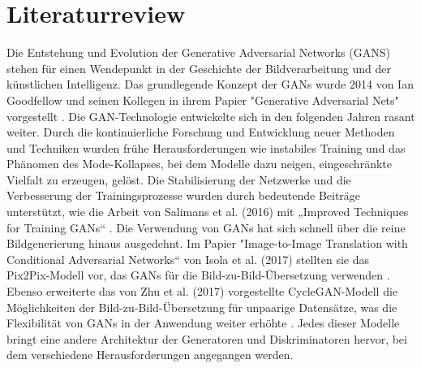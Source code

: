 \chapter{Literaturreview}

Die Entstehung und Evolution der Generative Adversarial Networks (GANS) stehen für einen Wendepunkt in der Geschichte der Bildverarbeitung und der künstlichen Intelligenz. Das grundlegende Konzept der GANs wurde 2014 von Ian Goodfellow und seinen Kollegen in ihrem Papier "Generative Adversarial Nets" vorgestellt \cite{Goodfellow2014}.\newline
Die GAN-Technologie entwickelte sich in den folgenden Jahren rasant weiter. Durch die kontinuierliche Forschung und Entwicklung neuer Methoden und Techniken wurden frühe Herausforderungen wie instabiles Training und das Phänomen des Mode-Kollapses, bei dem Modelle dazu neigen, eingeschränkte Vielfalt zu erzeugen, gelöst. Die Stabilisierung der Netzwerke und die Verbesserung der Trainingsprozesse wurden durch bedeutende Beiträge unterstützt, wie die Arbeit von Salimans et al. (2016) mit „Improved Techniques for Training GANs“ \cite{Salimans.2016}. \newline
Die Verwendung von GANs hat sich schnell über die reine Bildgenerierung hinaus ausgedehnt. Im Papier "Image-to-Image Translation with Conditional Adversarial Networks“ von Isola et al. (2017) stellten sie das Pix2Pix-Modell vor, das GANs für die Bild-zu-Bild-Übersetzung verwenden \cite{PhillipIsola.}. Ebenso erweiterte das von Zhu et al. (2017) vorgestellte CycleGAN-Modell die Möglichkeiten der Bild-zu-Bild-Übersetzung für unpaarige Datensätze, was die Flexibilität von GANs in der Anwendung weiter erhöhte \cite{Zhu.2017}. \newline
Jedes dieser Modelle bringt eine andere Architektur der Generatoren und Diskriminatoren hervor, bei dem verschiedene Herausforderungen angegangen werden. 